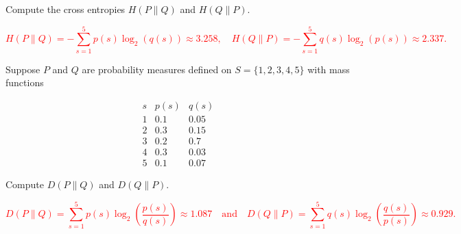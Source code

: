 \documentclass[12pt,reqno]{amsart}
\begin{document}
Compute the cross entropies $H( P \parallel Q)$ and $H(Q \parallel P)$.

\bigskip
\textcolor{red}{
	\[H( P \parallel Q) = - \sum_{s=1}^5 p(s) \log_2(q(s)) \approx 3.258, \quad H(Q \parallel P) = -\sum_{s=1}^5 q(s) \log_2(p(s)) \approx 2.337.
	\]}
\bigskip








\prob Suppose $P$ and $Q$ are probability measures defined on $S = \{1,2,3,4,5\}$ with mass functions

	\[
	\begin{array}{c|cc}
	s & p(s) & q(s) \\ \hline
	1 & 0.1 & 0.05 \\
	2 & 0.3 & 0.15 \\
	3 & 0.2 & 0.7 \\
	4 & 0.3 & 0.03 \\
	5 & 0.1 & 0.07
	\end{array}
	\]

Compute $D( P \parallel Q)$ and $D(Q\parallel P)$.

\bigskip
\textcolor{red}{
	\[D( P \parallel Q) = \sum_{s=1}^5 p(s) \log_2 \left( \frac{p(s)}{q(s)} \right) \approx 1.087 \quad \text{and} \quad D( Q \parallel P) = \sum_{s=1}^5 q(s) \log_2 \left( \frac{q(s)}{p(s)} \right) \approx 0.929.
	\]}
\bigskip
\end{document}
